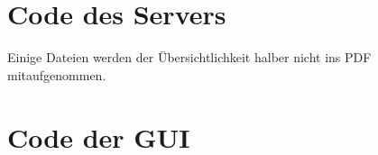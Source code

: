\documentclass[]{scrartcl}
\begin{document}
\newpage
\section{Code des Servers}
Einige Dateien werden der Übersichtlichkeit halber nicht ins PDF mitaufgenommen.

%



%







\section{Code der GUI}




\listoffigures
\end{document}
